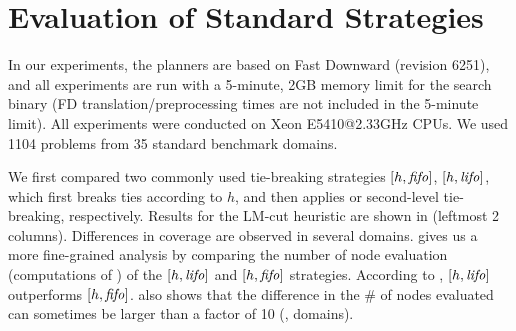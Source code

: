 
\section{Evaluation of  Standard Strategies}
\label{sec:eval-common-strategies}

In our experiments, the planners are based on Fast Downward (revision 6251), and all
experiments are run with a 5-minute, 2GB memory limit for the search binary (FD translation/preprocessing times are not included in the 5-minute limit).
All experiments were conducted on Xeon E5410@2.33GHz CPUs.
We used 1104 problems from 35 standard benchmark domains.


We first compared two commonly used tie-breaking strategies $[h,\mbox{\textit{fifo}}]$, $[h,\mbox{\textit{lifo}}]$, which
first breaks ties according to $h$, and then applies \fifo or \lifo
second-level tie-breaking, respectively.
Results for the LM-cut heuristic \cite{Helmert2009} are
shown in  (leftmost 2 columns).
Differences in coverage are observed in several domains.
% 
 gives us a
more fine-grained analysis by comparing the number of node evaluation
(computations of \lmcut) of the $[h,\mbox{\textit{lifo}}]$ and $[h,\mbox{\textit{fifo}}]$ strategies.
% 
According to ,
$[h,\mbox{\textit{lifo}}]$ outperforms $[h,\mbox{\textit{fifo}}]$.
 also shows that the difference in the \# of nodes
evaluated can sometimes be larger than a factor of 10 (,  domains).

